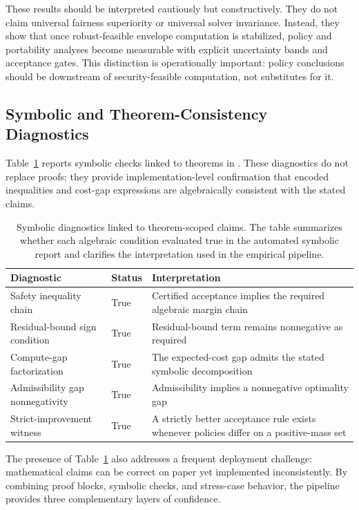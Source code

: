 \documentclass{article} %
\begin{document}
These results should be interpreted cautiously but constructively. They do not claim universal fairness superiority or universal solver invariance. Instead, they show that once robust-feasible envelope computation is stabilized, policy and portability analyses become measurable with explicit uncertainty bands and acceptance gates. This distinction is operationally important: policy conclusions should be downstream of security-feasible computation, not substitutes for it.

\subsection{Symbolic and Theorem-Consistency Diagnostics}
Table~\ref{tab:symbolic} reports symbolic checks linked to theorems in . These diagnostics do not replace proofs; they provide implementation-level confirmation that encoded inequalities and cost-gap expressions are algebraically consistent with the stated claims.

\begin{table}[t]
\caption{Symbolic diagnostics linked to theorem-scoped claims. The table summarizes whether each algebraic condition evaluated true in the automated symbolic report and clarifies the interpretation used in the empirical pipeline.}
\label{tab:symbolic}
\centering
\small
\renewcommand{\arraystretch}{1.1}
\setlength{\tabcolsep}{4pt}
\begin{tabular}{lll}
\hline
Diagnostic & Status & Interpretation \\
\hline
Safety inequality chain & True & Certified acceptance implies the required algebraic margin chain \\
Residual-bound sign condition & True & Residual-bound term remains nonnegative as required \\
Compute-gap factorization & True & The expected-cost gap admits the stated symbolic decomposition \\
Admissibility gap nonnegativity & True & Admissibility implies a nonnegative optimality gap \\
Strict-improvement witness & True & A strictly better acceptance rule exists whenever policies differ on a positive-mass set \\
\hline
\end{tabular}
\end{table}

The presence of Table~\ref{tab:symbolic} also addresses a frequent deployment challenge: mathematical claims can be correct on paper yet implemented inconsistently. By combining proof blocks, symbolic checks, and stress-case behavior, the pipeline provides three complementary layers of confidence.
\end{document}
